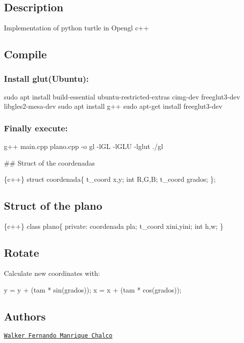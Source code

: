 \subsection*{Description}

Implementation of python turtle in Opengl c++

\subsection*{Compile}

\subsubsection*{Install glut(\+Ubuntu)\+:}

\begin{DoxyVerb}sudo apt install build-essential ubuntu-restricted-extras cimg-dev freeglut3-dev libgles2-mesa-dev
sudo apt install g++
sudo apt-get install freeglut3-dev
\end{DoxyVerb}


\subsubsection*{Finally execute\+:}

\begin{DoxyVerb}g++ main.cpp plano.cpp -o gl -lGL -lGLU -lglut
./gl
\end{DoxyVerb}


\#\# Struct of the coordenadas 
\begin{DoxyCode}
\{c++\}
struct coordenada\{
    t\_coord x,y;
    int R,G,B;
    t\_coord grados;
\};
\end{DoxyCode}


\subsection*{Struct of the plano}


\begin{DoxyCode}
\{c++\}
class plano\{
    private:
    coordenada pla;
    t\_coord xini,yini;
    int h,w;
    \}
\end{DoxyCode}
 \subsection*{Rotate}


\begin{DoxyItemize}
\item Calculate new coordinates with\+: 
\begin{DoxyCode}
y = y + (tam * sin(grados));
x = x + (tam * cos(grados));
\end{DoxyCode}
 \subsection*{Authors}
\end{DoxyItemize}


\begin{DoxyItemize}
\item \href{https://github.com/walker1239}{\tt Walker Fernando Manrique Chalco} 
\end{DoxyItemize}